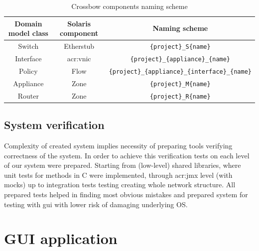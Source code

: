 \documentclass[11pt,openany]{book}
\begin{document}
        \begin{table}[H]
          \centering

          \begin{tabular}{|c|c|c|}
            \hline
            Domain model class & Solaris component & Naming scheme                                                \\
            \hline \hline
            Switch             & Etherstub         & \texttt{\{project\}\_S\{name\}}                              \\
            \hline
            Interface          & \gls{acr:vnic}    & \texttt{\{project\}\_\{appliance\}\_\{name\}}                \\
            \hline
            Policy             & Flow              & \texttt{\{project\}\_\{appliance\}\_\{interface\}\_\{name\}} \\
            \hline
            Appliance          & Zone              & \texttt{\{project\}\_M\{name\}}                              \\
            \hline
            Router             & Zone              & \texttt{\{project\}\_R\{name\}}                              \\
            \hline
          \end{tabular}

          \caption{Crossbow components naming scheme}
          \label{tab:impl:naming}
        \end{table}
		

      \subsection{System verification}
      \label{sec:impl:verif}
		
        Complexity of created system implies necessity of preparing tools verifying correctness of the system. In order
        to achieve this verification tests on each level of our system were prepared. Starting from (low-level) shared
        libraries, where unit tests for methods in C were implemented, through \gls{acr:jmx} level (with mocks)
        up to integration tests testing creating whole network structure. All prepared tests helped in finding most obvious
       mistakes and prepared system for testing with gui with lower risk of damaging underlying OS.  

      \section{GUI application}
      \label{sec:impl:gui}
		
\end{document}
